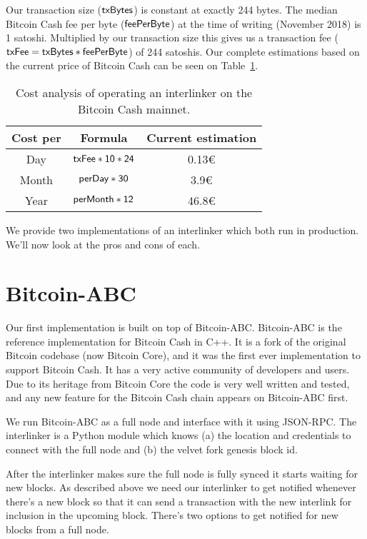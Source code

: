 Our transaction size ($\sf txBytes$) is constant at exactly 244 bytes. The median Bitcoin Cash fee per byte ($\sf feePerByte$) at the time of writing (November 2018) is 1 satoshi. Multiplied by our transaction size this gives us a transaction fee ($\sf txFee = txBytes * feePerByte$) of 244 satoshis.  Our complete estimations based on the current price of Bitcoin Cash can be seen on Table~\ref{tbl:cost-analysis}.

\begin{table}
  \centering
  \begin{tabular}{|c|c|c|}
    \hline
    Cost per & Formula & Current estimation \\
    \hline
    Day & $\sf txFee * 10 * 24$ & 0.13€ \\
    Month & $\sf perDay * 30$ & 3.9€ \\
    Year & $\sf perMonth * 12$ & 46.8€ \\
    \hline
  \end{tabular}
  \caption{Cost analysis of operating an interlinker on the Bitcoin Cash mainnet.}
  \label{tbl:cost-analysis}
\end{table}

We provide two implementations of an interlinker which both run in production. We'll now look at the pros and cons of each.

\section{Bitcoin-ABC}
Our first implementation is built on top of Bitcoin-ABC. Bitcoin-ABC is the reference implementation for Bitcoin Cash in C++. It is a fork of the original Bitcoin codebase (now Bitcoin Core), and it was the first ever implementation to support Bitcoin Cash. It has a very active community of developers and users. Due to its heritage from Bitcoin Core the code is very well written and tested, and any new feature for the Bitcoin Cash chain appears on Bitcoin-ABC first.

We run Bitcoin-ABC as a full node and interface with it using JSON-RPC. The interlinker is a Python module which knows (a) the location and credentials to connect with the full node and (b) the velvet fork genesis block id.

After the interlinker makes sure the full node is fully synced it starts waiting for new blocks. As described above we need our interlinker to get notified whenever there's a new block so that it can send a transaction with the new interlink for inclusion in the upcoming block. There's two options to get notified for new blocks from a full node.

